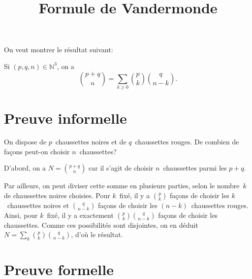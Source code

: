 \documentclass{yann}
\begin{document}
\title{Formule de Vandermonde}
\maketitle

On veut montrer le résultat suivant:
\begin{tcolorbox}
  Si $(p,q,n)∈ℕ^3$, on a
  \[ \binom{p+q}{n} = ∑_{k≥0} \binom{p}{k} \binom{q}{n-k}. \]
\end{tcolorbox}

\section{Preuve informelle}

On dispose de $p$~chaussettes noires et de $q$~chaussettes rouges.
De combien de façons peut-on choisir $n$~chaussettes?

D'abord, on a $N = \binom{p+q}{n}$ car il s'agit de choisir $n$~chaussettes parmi les $p+q$.

Par ailleurs, on peut diviser cette somme en plusieurs parties, selon le nombre~$k$ de chaussettes noires choisies.
Pour $k$~fixé, il y a $\binom{p}{k}$ façons de choisir les $k$~chaussettes noires
et $\binom{q}{n-k}$ façons de choisir les $(n-k)$~chaussettes rouges.
Ainsi, pour $k$~fixé, il y a exactement $\binom{p}{k} \binom{q}{n-k}$ façons de choisir les chaussettes.
Comme ces possibilités sont disjointes, on en déduit $N = ∑_k \binom{p}{k} \binom{q}{n-k}$, d'où le résultat.

\section{Preuve formelle}
\end{document}

